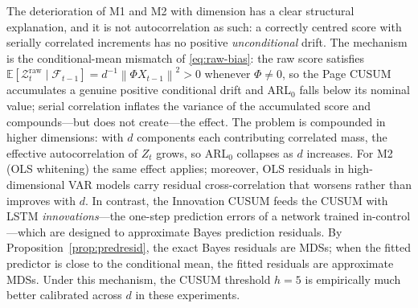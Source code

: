 \documentclass[bj,authoryear]{imsart}
\theoremstyle{plain}
\theoremstyle{definition}
\newcommand{\E}{\mathbb{E}}
\newcommand{\F}{\mathcal{F}}
\newcommand{\norm}[1]{\left\lVert #1 \right\rVert}
\newcommand{\given}{\mid}
\begin{document}
The deterioration of M1 and M2 with dimension has a clear structural
explanation, and it is not autocorrelation as such: a correctly centred score
with serially correlated increments has no positive \emph{unconditional} drift.
The mechanism is the conditional-mean mismatch of \eqref{eq:raw-bias}: the raw
score satisfies
$\E[\mathcal Z_t^{\mathrm{raw}}\given\F_{t-1}]=d^{-1}\norm{\Phi X_{t-1}}^2>0$
whenever $\Phi\neq0$, so the Page CUSUM accumulates a genuine positive
conditional drift and ARL$_0$ falls below its nominal value; serial correlation
inflates the variance of the accumulated score and compounds---but does not
create---the effect.
The problem is compounded in higher dimensions: with $d$ components each
contributing correlated mass, the effective autocorrelation of $Z_t$ grows,
so ARL$_0$ collapses as $d$ increases.
For M2 (OLS whitening) the same effect applies; moreover, OLS residuals
in high-dimensional VAR models carry residual cross-correlation that
worsens rather than improves with $d$.
In contrast, the Innovation CUSUM feeds the CUSUM with LSTM \emph{innovations}---the
one-step prediction errors of a network trained in-control---which are designed to approximate Bayes prediction residuals.
By Proposition~\ref{prop:predresid}, the exact Bayes residuals are MDSs;
when the fitted predictor is close to the conditional mean, the fitted residuals
are approximate MDSs.  Under this mechanism, the CUSUM threshold $h=5$ is empirically much better calibrated across $d$ in these experiments.
\end{document}
